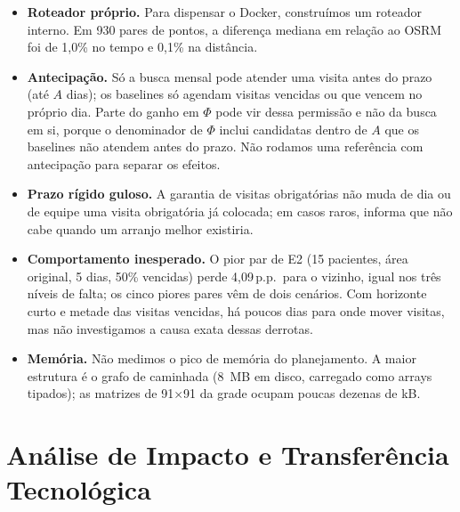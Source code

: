 \documentclass[11pt,a4paper]{article}
\newcommand{\pp}{\,p.p.}
\begin{document}
\begin{itemize}
A rede atual, derivada do extrato da Região Sul da Geofabrik
baixado em 08/11/2026, cobre 129 dos 132 territórios do
GeoSaúde; nos três restantes (ilhas e zona rural), pontos
sintéticos ficam a mais de 1~km de qualquer via. Esse número
descreve a cobertura da rede atual, não uma reavaliação de E1
a E3.
    \item \textbf{Roteador próprio.} Para dispensar o Docker, construímos um roteador interno. Em 930 pares de pontos, a diferença mediana em relação ao OSRM foi de 1,0\% no tempo e 0,1\% na distância.
    \item \textbf{Antecipação.} Só a busca mensal pode atender uma
visita antes do prazo (até $A$ dias); os baselines só agendam
visitas vencidas ou que vencem no próprio dia. Parte do ganho em $\Phi$ pode vir
dessa permissão e não da busca em si, porque o denominador de
$\Phi$ inclui candidatas dentro de $A$ que os baselines não
atendem antes do prazo. Não rodamos uma referência com
antecipação para separar os efeitos.
    \item \textbf{Prazo rígido guloso.} A garantia de visitas obrigatórias não muda de dia ou de equipe uma visita obrigatória já colocada; em casos raros, informa que não cabe quando um arranjo melhor existiria.
    \item \textbf{Comportamento inesperado.} O pior par de E2 (15 pacientes, área original, 5 dias, 50\% vencidas) perde 4,09\pp\ para o vizinho, igual nos três níveis de falta; os cinco piores pares vêm de dois cenários. Com horizonte curto e metade das visitas vencidas, há poucos dias para onde mover visitas, mas não investigamos a causa exata dessas derrotas.
    \item \textbf{Memória.} Não medimos o pico de memória do planejamento. A maior estrutura é o grafo de caminhada (8~MB em disco, carregado como arrays tipados); as matrizes de 91$\times$91 da grade ocupam poucas dezenas de kB.
\end{itemize}

\section{Análise de Impacto e Transferência Tecnológica}
\end{document}
